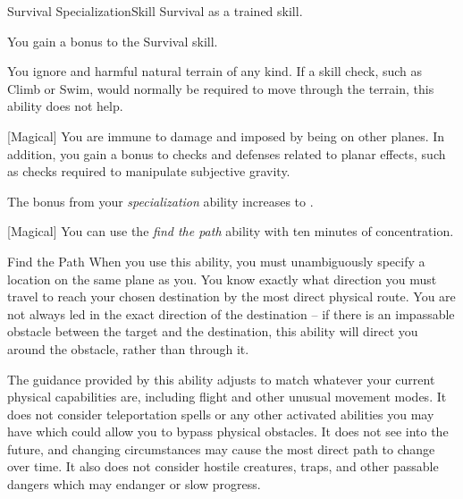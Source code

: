     \begin{feat}{Survival Specialization}{Skill}
        \featpre Survival as a trained skill.

         You gain a  bonus to the Survival skill.

         You ignore  and harmful natural terrain of any kind.
        If a skill check, such as Climb or Swim, would normally be required to move through the terrain, this ability does not help.

        [Magical] You are immune to damage and  imposed by being on other planes.
        In addition, you gain a  bonus to checks and defenses related to planar effects, such as checks required to manipulate subjective gravity.

         The bonus from your \textit{specialization} ability increases to .

        [Magical] You can use the \textit{find the path} ability with ten minutes of concentration.
        \begin{attuneability}{Find the Path}{}
            \rankline
            When you use this ability, you must unambiguously specify a location on the same plane as you.
            You know exactly what direction you must travel to reach your chosen destination by the most direct physical route.
            You are not always led in the exact direction of the destination -- if there is an impassable obstacle between the target and the destination, this ability will direct you around the obstacle, rather than through it.

            The guidance provided by this ability adjusts to match whatever your current physical capabilities are, including flight and other unusual movement modes.
            It does not consider teleportation spells or any other activated abilities you may have which could allow you to bypass physical obstacles.
            It does not see into the future, and changing circumstances may cause the most direct path to change over time.
            It also does not consider hostile creatures, traps, and other passable dangers which may endanger or slow progress.
        \end{attuneability}
    \end{feat}

